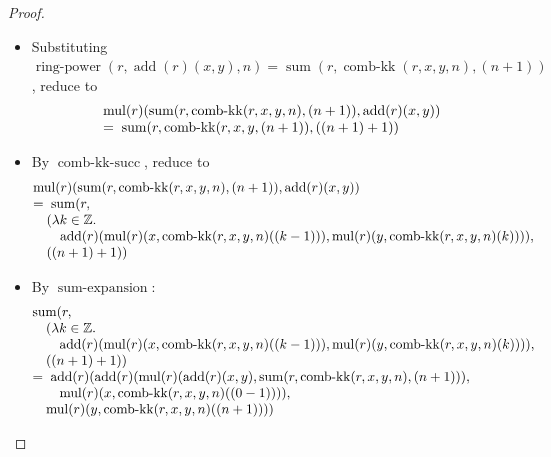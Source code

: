 \documentclass[11pt]{article}
\theoremstyle{plain}
\begin{document}
\begin{proof}
\begin{itemize}[leftmargin=2.8em, itemsep=4pt, parsep=1pt]
  \item[\textbf{34}] Substituting $\operatorname{ring\text{-}power}(r, \operatorname{add}(r)(x, y), n) = \operatorname{sum}(r, \operatorname{comb\text{-}kk}(r, x, y, n), (n + 1))$, reduce to
\begin{equation*}
\begin{array}{@{}l@{}} \operatorname{mul}(r)(\operatorname{sum}(r, \operatorname{comb\text{-}kk}(r, x, y, n), (n + 1)), \operatorname{add}(r)(x, y)) \\ =\; \operatorname{sum}(r, \operatorname{comb\text{-}kk}(r, x, y, (n + 1)), ((n + 1) + 1)) \end{array}
\end{equation*}

  \item[\textbf{35}] By $\operatorname{comb\text{-}kk\text{-}succ}$, reduce to
\begin{equation*}
\begin{array}{@{}l@{}} \operatorname{mul}(r)(\operatorname{sum}(r, \operatorname{comb\text{-}kk}(r, x, y, n), (n + 1)), \operatorname{add}(r)(x, y)) \\ =\; \operatorname{sum}(r, \\ \quad (\lambda k \in \mathbb{Z}.\; \\ \quad \quad \operatorname{add}(r)(\operatorname{mul}(r)(x, \operatorname{comb\text{-}kk}(r, x, y, n)((k - 1))), \operatorname{mul}(r)(y, \operatorname{comb\text{-}kk}(r, x, y, n)(k)))), \\ \quad ((n + 1) + 1)) \end{array}
\end{equation*}

  \item[\textbf{36}] By $\operatorname{sum\text{-}expansion}$:
\begin{equation*}
\begin{array}{@{}l@{}} \operatorname{sum}(r, \\ \quad (\lambda k \in \mathbb{Z}.\; \\ \quad \quad \operatorname{add}(r)(\operatorname{mul}(r)(x, \operatorname{comb\text{-}kk}(r, x, y, n)((k - 1))), \operatorname{mul}(r)(y, \operatorname{comb\text{-}kk}(r, x, y, n)(k)))), \\ \quad ((n + 1) + 1)) \\ =\; \operatorname{add}(r)(\operatorname{add}(r)(\operatorname{mul}(r)(\operatorname{add}(r)(x, y), \operatorname{sum}(r, \operatorname{comb\text{-}kk}(r, x, y, n), (n + 1))), \\ \quad \quad \operatorname{mul}(r)(x, \operatorname{comb\text{-}kk}(r, x, y, n)((0 - 1)))), \\ \quad \operatorname{mul}(r)(y, \operatorname{comb\text{-}kk}(r, x, y, n)((n + 1)))) \end{array}
\end{equation*}


\end{itemize}
\end{proof}
\end{document}
